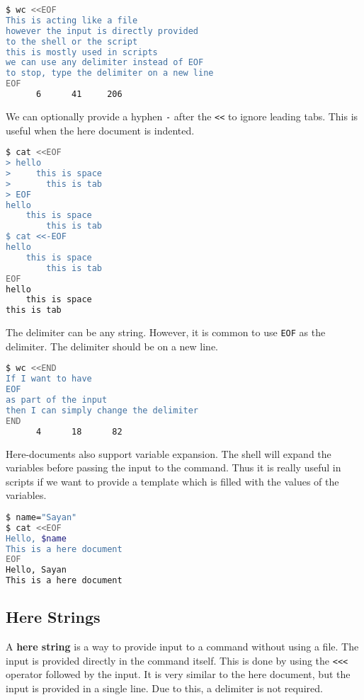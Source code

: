 \begin{lstlisting}[language=bash]
$ wc <<EOF
This is acting like a file
however the input is directly provided
to the shell or the script
this is mostly used in scripts
we can use any delimiter instead of EOF
to stop, type the delimiter on a new line
EOF
      6      41     206
\end{lstlisting}

We can optionally provide a hyphen \lstinline|-| after the \lstinline|<<|
to ignore leading tabs. This is useful when the here document is
indented.

\begin{lstlisting}[language=bash]
$ cat <<EOF
> hello
>     this is space
>       this is tab
> EOF
hello
    this is space
        this is tab
$ cat <<-EOF
hello
    this is space
        this is tab
EOF
hello
    this is space
this is tab
\end{lstlisting}

The delimiter can be any string. However, it is common to use \lstinline|EOF|
as the delimiter. The delimiter should be on a new line.

\begin{lstlisting}[language=bash]
$ wc <<END
If I want to have
EOF
as part of the input
then I can simply change the delimiter
END
      4      18      82
\end{lstlisting}

Here-documents also support variable expansion. The shell will expand
the variables before passing the input to the command. Thus
it is really useful in scripts if we want to provide a template
which is filled with the values of the variables.

\begin{lstlisting}[language=bash]
$ name="Sayan"
$ cat <<EOF
Hello, $name
This is a here document
EOF
Hello, Sayan
This is a here document
\end{lstlisting}

\subsection{Here Strings}

A \textbf{here string} is a way to provide input to a command without
using a file. The input is provided directly in the command itself.
This is done by using the \lstinline|<<<| operator followed by the input.
It is very similar to the here document, but the input is provided
in a single line. Due to this, a delimiter is not required.

